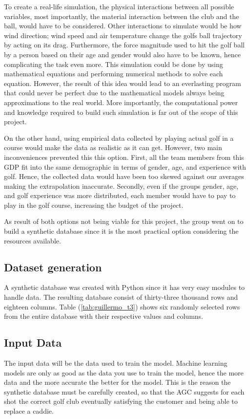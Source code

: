 \documentclass[11pt,landscape]{article}
\begin{document}
\begin{multicols}{3}
To create a real-life simulation, the physical interactions between all possible
variables, most importantly, the material interaction between the club and the
ball, would have to be considered. Other interactions to simulate would be how
wind direction; wind speed and air temperature change the golfs ball trajectory
by acting on its drag. Furthermore, the force magnitude used to hit the golf
ball by a person based on their age and gender would also have to be known,
hence complicating the task even more. This simulation could be done by using
mathematical equations and performing numerical methods to solve each equation.
However, the result of this idea would lead to an everlasting program that could
never be perfect due to the mathematical models always being approximations to
the real world. More importantly, the computational power and knowledge required
to build such simulation is far out of the scope of this project. 

On the other hand, using empirical data collected by playing actual golf in a
course would make the data as realistic as it can get. However, two main
inconveniences prevented this this option. First, all the team members from
this GDP fit into the same demographic in terms of gender, age, and experience
with golf. Hence, the collected data would have been too skewed against our
averages making the extrapolation inaccurate. Secondly, even if the groups
gender, age, and golf experience was more distributed, each member would have to
pay to play in the golf course, increasing the budget of the project.

As result of both options not being viable for this project, the group went on
to build a synthetic database since it is the most practical option considering
the resources available.

\subsection{Dataset generation}
A synthetic database was created with Python since it has very easy modules to
handle data. The resulting database consist of thirty-three thousand rows and
eighteen columns. Table (\ref{tab:guillermo_t3}) shows six randomly selected rows from the entire
database with their respective values and columns.

\subsection{Input Data}
The input data will be the data used to train the model. Machine learning models
are only as good as the data you use to train the model, hence the more data and
the more accurate the better for the model. This is the reason the synthetic
database must be carefully created, so that the AGC suggests for each shot the
correct golf club eventually satisfying the customer and being able to replace a
caddie.


\end{multicols}
\end{document}
